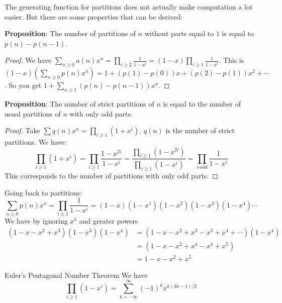 \documentclass{report}
\begin{document}
The generating function for partitions does not actually make computation a lot easier. But there are some properties that can be derived:

\textbf{Proposition}: The number of partitions of $n$ without parts equal to $1$ is equal to $p(n) - p(n - 1)$. 
    \begin{proof}
        We have $\sum_{n \geq 0}a(n)x^{n} = \prod_{i \geq 2}\frac{1}{1 - x^{i}} = (1 - x)\prod_{i \geq 1}\frac{1}{1 - x^{i}}$. This is $(1 - x)(\sum_{n \geq 0}p(n)x^{n}) = 1 + (p(1) - p(0))x + (p(2) - p(1)) x^{2} + \cdots $. So you get $1 + \sum_{n \geq 1}(p(n) - p(n - 1))x^{n}$.
    \end{proof}

\textbf{Proposition}: The number of strict partitions of $n$ is equal to the number of usual partitions of $n$ with only odd parts.
    \begin{proof}
        Take $\sum q(n)x^{n} = \prod_{i \geq 1}(1 + x^{i})$, $q(n)$ is the number of strict partitions. We have:
            \begin{equation*}
                \prod_{i \geq 1}(1 + x^{i}) = \prod_{i \geq 1}\dfrac{1 - x^{2i}}{1 - x^{i}} = \dfrac{\prod_{i \geq 1}(1 - x^{2i})}{\prod_{i \geq 1}(1 - x^{i})} = \prod_{i\text{-odd}}\dfrac{1}{1 - x^{i}}
            \end{equation*}
        This corresponds to the number of partitions with only odd parts.
    \end{proof}

Going back to partitions:
    \begin{equation*}
        \sum_{n \geq 0}p(n)x^{n} = \prod_{i \geq 1}\dfrac{1}{1 - x^{i}} = (1 - x)(1 - x^{1})(1 - x^{2})(1 - x^{3})(1 - x^{4}) \cdots 
    \end{equation*}
We have by ignoring $x^{5}$ and greater powers
    \begin{align*}
        (1 - x - x^{2} + x^{3})(1 - x^{3})(1 - x^{4}) &= (1 - x - x^{2} + x^{3} - x^{3} + x^{4} + \cdots )(1  -x^{4}) \\
                                                      &= (1 - x - x^{2} + x^{4} - x^{4} + x^{5})                                                                 \\
                                                      &= 1 - x - x^{2} + x^{5}                                                                                     
    \end{align*}

\begin{theorem}{Euler's Pentagonal Number Theorem}
    We have
        \begin{equation*}
            \prod_{i \geq 1}(1 - x^{i}) = \sum_{k = -\infty }^{\infty }(-1)^{k}x^{k(3k - 1)/2}
        \end{equation*}
\end{theorem}
\end{document}
